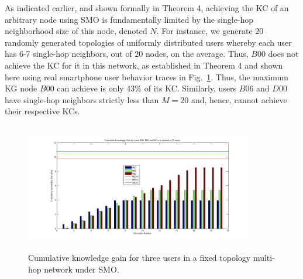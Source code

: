 \documentclass[conference]{IEEEtran}
\theoremstyle{definition}
\begin{document}
As indicated earlier, and shown formally in Theorem 4, achieving the KC of an arbitrary node using SMO is fundamentally limited by the single-hop neighborhood size of this node, denoted $N$.
For instance, we generate $20$ randomly generated topologies of uniformly distributed users whereby each user has 6-7 single-hop neighbors, out of $20$ nodes, on the average. Thus, $B00$ 
does not achieve the KC for it in this network, as established in Theorem 4 and shown here using real smartphone user behavior traces in Fig.~\ref{fig:B00_SMHOP)}. Thus, the maximum KG node $B00$ can achieve is only 43\% of its KC. Similarly, users $B06$ and $D00$ have single-hop neighbors strictly less than $M=20$ and, hence, cannot achieve their respective KCs. 
%
\begin{figure}[!bp]
\centering
 \includegraphics[width=10cm ,height=5.6cm]{figures_png/Fig7}
    \caption{Cumulative knowledge gain for three users in a fixed topology multi-hop network under SMO.}\label{fig:B00_SMHOP)}
\end{figure} 
    
\end{document}
